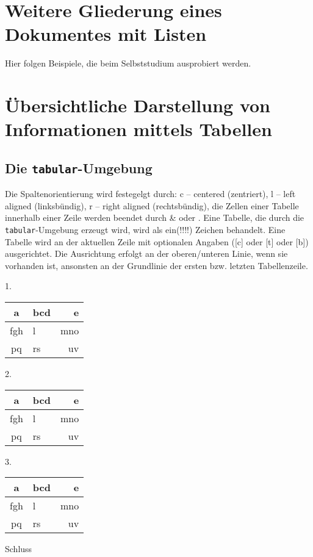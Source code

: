\documentclass[ngerman,               %
               a4paper,               %
               fleqn,                 %
                     ]{scrartcl}       %
\begin{document}
\section[Listen]{Weitere Gliederung eines Dokumentes mit Listen}

Hier folgen Beispiele, die beim Selbststudium ausprobiert werden.

\section[Tabellen]{Übersichtliche Darstellung von Informationen mittels
  Tabellen}

\subsection{Die \texttt{tabular}-Umgebung}

Die Spaltenorientierung wird festegelgt durch: c -- centered (zentriert), l
-- left aligned (linksbündig), r -- right aligned (rechtsbündig), die
Zellen einer Tabelle innerhalb einer Zeile werden beendet durch \& oder
\cs{}\cs{}. Eine Tabelle, die durch die \texttt{tabular}-Umgebung erzeugt
wird, wird als ein(!!!!) Zeichen behandelt. Eine Tabelle wird an der
aktuellen Zeile mit optionalen Angaben ([c] oder [t] oder [b])
ausgerichtet. Die Ausrichtung erfolgt an der oberen/unteren Linie, wenn sie
vorhanden ist, ansonsten an der Grundlinie der ersten bzw. letzten
Tabellenzeile.

1.%
\begin{tabular}{|c|l|r|}
  \hline
  a & bcd & e \\
  \hline
  fgh & l & mno \\
  \hline
  pq & rs & uv \\
  \hline
\end{tabular}%
2.%
\begin{tabular}[t]{|c|l|r|}
  \hline
  a & bcd & e \\
  \hline
  fgh & l & mno \\
  \hline
  pq & rs & uv \\
  \hline
\end{tabular}%
3.%
\begin{tabular}[b]{|c|l|r|}
  \hline
  a & bcd & e \\
  \hline
  fgh & l & mno \\
  \hline
  pq & rs & uv \\
  \hline
\end{tabular}%
Schluss
\end{document}
